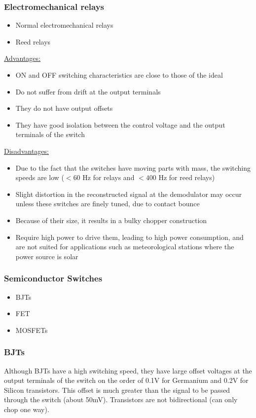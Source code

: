 \documentclass[a4paper,9pt,twoside,openany,twocolumn]{memoir}
\begin{document}
\subsubsection{Electromechanical relays}
\begin{itemize}
    \item Normal electromechanical relays
    \item Reed relays
\end{itemize}

\uline{Advantages:}
\begin{itemize}
    \item ON and OFF switching characteristics are close to those of the ideal
    \item Do not suffer from drift at the output terminals
    \item They do not have output offsets
    \item They have good isolation between the control voltage and the output terminals of the switch
\end{itemize}

\uline{Disadvantages:}
\begin{itemize}
    \item Due to the fact that the switches have moving parts with mass, the switching speeds are low ($< 60$ Hz for relays and $< 400$ Hz for reed relays)
    \item Slight distortion in the reconstructed signal at the demodulator may occur unless these switches are finely tuned, due to contact bounce
    \item Because of their size, it results in a bulky chopper construction
    \item Require high power to drive them, leading to high power consumption, and are not suited for applications such as meteorological stations where the power source is solar
\end{itemize}

\subsubsection*{Semiconductor Switches}
\begin{itemize}
    \item BJTs
    \item FET
    \item MOSFETs
\end{itemize}

\subsubsection*{BJTs}
Although BJTs have a high switching speed, they have large offset voltages at the output terminals of the switch on the order of 0.1V for Germanium and 0.2V for Silicon transistors. This offset is much greater than the signal to be passed through the switch (about 50mV). Transistors are not bidirectional (can only chop one way).
\end{document}
